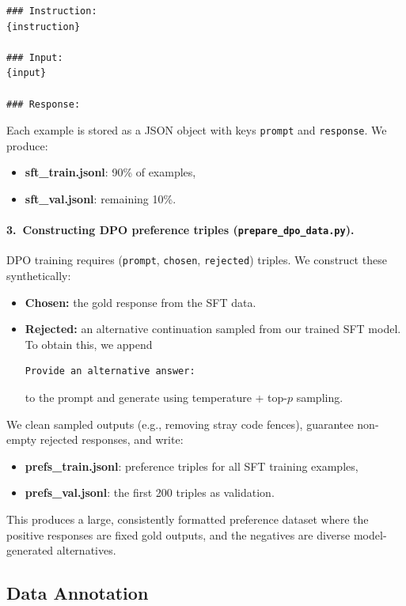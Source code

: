 \documentclass[11pt,a4paper]{article}
\begin{document}
\begin{verbatim}
### Instruction:
{instruction}

### Input:
{input}

### Response:
\end{verbatim}

Each example is stored as a JSON object with keys \texttt{prompt} and \texttt{response}.  
We produce:
\begin{itemize}
    \item \textbf{sft\_train.jsonl}: 90\% of examples,
    \item \textbf{sft\_val.jsonl}: remaining 10\%.
\end{itemize}

\paragraph{3.\ Constructing DPO preference triples (\texttt{prepare\_dpo\_data.py}).}
DPO training requires (\texttt{prompt}, \texttt{chosen}, \texttt{rejected}) triples. We construct these synthetically:

\begin{itemize}
    \item \textbf{Chosen:} the gold response from the SFT data.
    \item \textbf{Rejected:} an alternative continuation sampled from our trained SFT model. To obtain this, we append
\begin{verbatim}
Provide an alternative answer:
\end{verbatim}
    to the prompt and generate using temperature + top-$p$ sampling.
\end{itemize}

We clean sampled outputs (e.g., removing stray code fences), guarantee non-empty rejected responses, and write:
\begin{itemize}
    \item \textbf{prefs\_train.jsonl}: preference triples for all SFT training examples,
    \item \textbf{prefs\_val.jsonl}: the first 200 triples as validation.
\end{itemize}

This produces a large, consistently formatted preference dataset where the positive responses are fixed gold outputs, and the negatives are diverse model-generated alternatives.

\subsection{Data Annotation}
\end{document}

